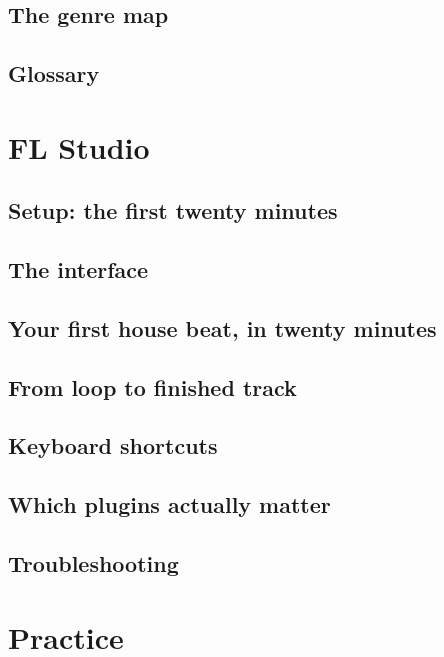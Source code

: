 \documentclass[11pt,letterpaper,oneside]{book}
\begin{document}
\chapter{The genre map}


\chapter{Glossary}


\part{FL Studio}
\chapter{Setup: the first twenty minutes}


\chapter{The interface}


\chapter{Your first house beat, in twenty minutes}


\chapter{From loop to finished track}


\chapter{Keyboard shortcuts}


\chapter{Which plugins actually matter}


\chapter{Troubleshooting}


\part{Practice}
\end{document}
